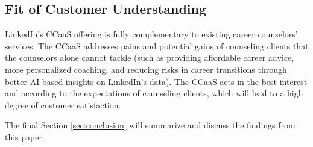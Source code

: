 \subsection{Fit of Customer Understanding}

LinkedIn's CCaaS offering is fully complementary to existing career counselors' services. The CCaaS
addresses pains and potential gains of counseling clients that the counselors alone cannot tackle 
(such as providing affordable career advice, more personalized coaching, and reducing risks 
in career transitions through better AI-based insights on LinkedIn's data). The CCaaS acts in the
best interest and according to the expectations of counseling clients, which will lead to a high
degree of customer satisfaction.
\newline

\noindent The final Section \ref{sec:conclusion} will summarize and discuss the findings from 
this paper.
